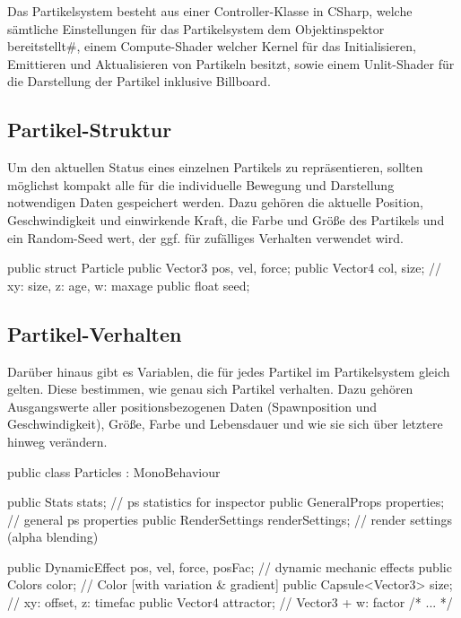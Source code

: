 Das Partikelsystem besteht aus einer Controller-Klasse in CSharp, welche sämtliche Einstellungen für das Partikelsystem dem Objektinspektor bereitstellt\#, einem Compute-Shader welcher Kernel für das Initialisieren, Emittieren und Aktualisieren von Partikeln besitzt, sowie einem Unlit-Shader für die Darstellung der Partikel inklusive Billboard.


\subsection{Partikel-Struktur}

Um den aktuellen Status eines einzelnen Partikels zu repräsentieren, sollten möglichst kompakt alle für die individuelle Bewegung und Darstellung notwendigen Daten gespeichert werden. Dazu gehören die aktuelle Position, Geschwindigkeit und einwirkende Kraft, die Farbe und Grö{\ss}e des Partikels und ein Random-Seed wert, der ggf. für zufälliges Verhalten verwendet wird.

\begin{csh}[caption=Partikelstruktur,label=lst:particle]
public struct Particle
{
    public Vector3 pos, vel, force;
    public Vector4 col, size; // xy: size,  z: age, w: maxage
    public float seed;
}
\end{csh}


\subsection{Partikel-Verhalten}

Darüber hinaus gibt es Variablen, die für jedes Partikel im Partikelsystem gleich gelten. Diese bestimmen, wie genau sich Partikel verhalten. Dazu gehören Ausgangswerte aller positionsbezogenen Daten (Spawnposition und Geschwindigkeit), Grö{\ss}e, Farbe und Lebensdauer und wie sie sich über letztere hinweg verändern.

\begin{csh}
public class Particles : MonoBehaviour
{
    public Stats stats;                   // ps statistics for inspector
    public GeneralProps properties;       // general ps properties
    public RenderSettings renderSettings; // render settings (alpha blending)

    public DynamicEffect pos, vel, force, posFac; // dynamic mechanic effects
    public Colors color;          // Color [with variation & gradient]
    public Capsule<Vector3> size; // xy: offset, z: timefac
    public Vector4 attractor;     // Vector3 + w: factor
    /* ... */
}
\end{csh}



